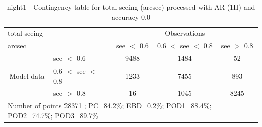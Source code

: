 \begin{table}[p!]
\begin{center}
\begin{tabular}{llccc}
\hline
{total seeing}                                       &                                                    & \multicolumn{3}{c}{Observations}                 \\
{arcsec}                                       &                             & see $<$ 0.6   & 0.6 $<$ see $<$ 0.8 & see $>$ 0.8 \\
\hline
\multicolumn{1}{c}{\multirow{3}{*}{Model data}}  & see $<$ 0.6             & 9488                & 1484                       & 52              \\
                                                 & 0.6  $<$ see $<$ 0.8 & 1233                & 7455                       & 893              \\
                                                 & see $>$ 0.8             & 16                & 1045                       & 8245              \\
\hline
\multicolumn{5}{l}{ Number of points        28371 ; PC=84.2\%; EBD=0.2\%; POD1=88.4\%; POD2=74.7\%; POD3=89.7\%}
\end{tabular}
\end{center}
\caption{night1 - Contingency table for  total seeing (arcsec) processed with AR (1H) and accuracy 0.0}
\label{tab:contingencyseeAFT:night1}
\end{table}
